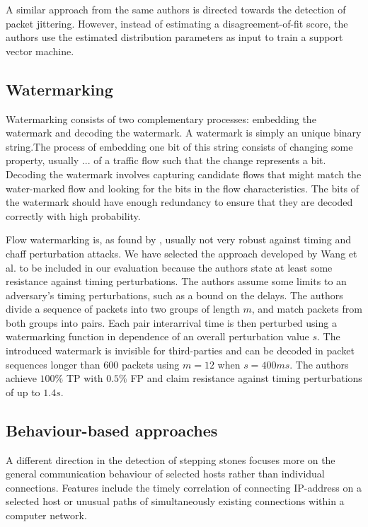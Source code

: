 \documentclass[runningheads]{llncs}\usepackage[]{graphicx}\usepackage[]{color}
\begin{document}
A similar approach from the same authors \cite{ding2013detecting} is directed towards the detection of packet jittering. However, instead of estimating a disagreement-of-fit score, the authors use the estimated distribution parameters as input to train a support vector machine. 

\subsection{Watermarking}

Watermarking consists of two complementary processes: embedding the watermark and decoding the watermark. A watermark is simply an unique binary string.The process of embedding one bit of this string consists of changing some property, usually ... of a traffic flow such that the change represents a bit. Decoding the watermark involves capturing candidate flows that might match the water-marked flow and looking for the bits in the flow characteristics. The bits of the watermark should have enough redundancy to ensure that they are decoded correctly with high probability.

Flow watermarking is, as found by \cite{iacovazzi2016network}, usually not very robust against timing and chaff perturbation attacks. We have selected the approach developed by Wang et al. \cite{wang2010robust} to be included in our evaluation because the authors state at least some resistance against timing perturbations. The authors assume some limits to an adversary's  timing perturbations, such as a bound on the delays. The authors divide a sequence of packets into two groups of length $m$, and match packets from both groups into pairs. Each pair interarrival time is then perturbed using a watermarking function in dependence of an overall perturbation value $s$. 
The introduced watermark is invisible for third-parties and can be decoded in packet sequences longer than 600 packets using $m=12$ when $s=400ms$.  The authors achieve $100\%$ TP with $0.5\%$ FP and claim resistance against timing perturbations of up to $1.4s$.




\subsection{Behaviour-based approaches}

A different direction in the detection of stepping stones focuses more on the general communication behaviour of selected hosts rather than individual connections. Features include the timely correlation of connecting IP-address on a selected host or unusual paths of simultaneously existing connections within a computer network.
\end{document}
